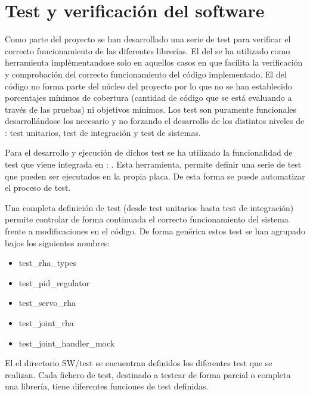 	
\section{Test y verificación del software} \label{sec:SW:test}
    Como parte del proyecto se han desarrollado una serie de test para verificar el correcto funcionamiento de las diferentes librerías. El  del  se ha utilizado como herramienta implémentandose solo en aquellos casos en que facilita la verificación y comprobación del correcto funcionamiento del código implementado. El  del código no forma parte del núcleo del proyecto por lo que no se han establecido porcentajes mínimos de cobertura (cantidad de código que se está evaluando a través de las pruebas) ni objetivos mínimos. Los test son puramente funcionales desarrollándose los necesario y no forzando el desarrollo de los distintos niveles de : test unitarios, test de integración y test de sistemas. 

    Para el desarrollo y ejecución de dichos test se ha utilizado la funcionalidad de test que viene integrada en : . Esta herramienta, permite definir una serie de test que pueden ser ejecutados en la propia placa. De esta forma se puede automatizar el proceso de test.

    Una completa definición de test (desde test unitarios hasta test de integración) permite controlar de forma continuada el correcto funcionamiento del sistema frente a modificaciones en el código. De forma genérica estos test se han agrupado bajos los siguientes nombres:

    \begin{itemize}
        \item test\_rha\_types
        \item test\_pid\_regulator
        \item test\_servo\_rha
        \item test\_joint\_rha
        \item test\_joint\_handler\_mock
    \end{itemize}

    El el directorio SW/test se encuentran definidos los diferentes test que se realizan. Cada fichero de test, destinado a testear de forma parcial o completa una librería, tiene diferentes funciones de test definidas.

